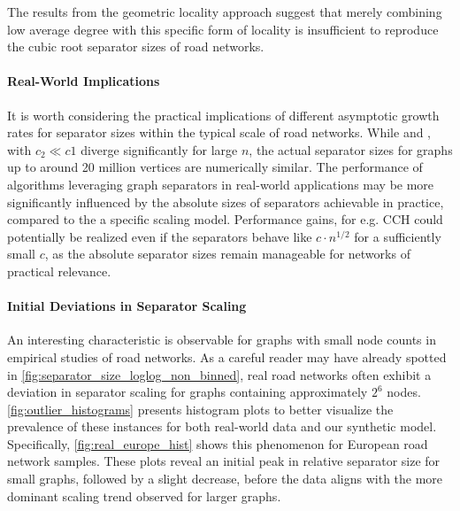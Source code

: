 The results from the geometric locality approach suggest that merely combining low average degree with this specific form of locality is insufficient to reproduce the cubic root separator sizes of road networks.

\paragraph{Real-World Implications}

It is worth considering the practical implications of different asymptotic growth rates for separator sizes within the typical scale of road networks.
While  and , with \(c_2 \ll c1\) diverge significantly for large \(n\), the actual separator sizes for graphs up to around 20 million vertices are numerically similar.
The performance of algorithms leveraging graph separators in real-world applications may be more significantly influenced by the absolute sizes of separators achievable in practice, compared to the a specific scaling model.
Performance gains, for e.g. CCH could potentially be realized even if the separators behave like \(c \cdot n^{1/2}\) for a sufficiently small \(c\), as the absolute separator sizes remain manageable for networks of practical relevance.

\paragraph{Initial Deviations in Separator Scaling}

An interesting characteristic is observable for graphs with small node counts in empirical studies of road networks.
As a careful reader may have already spotted in \cref{fig:separator_size_loglog_non_binned}, real road networks often exhibit a deviation in separator scaling for graphs containing approximately \(2^6\) nodes.
\cref{fig:outlier_histograms} presents histogram plots to better visualize the prevalence of these instances for both real-world data and our synthetic model.
Specifically, \cref{fig:real_europe_hist} shows this phenomenon for European road network samples.
These plots reveal an initial peak in relative separator size for small graphs, followed by a slight decrease, before the data aligns with the more dominant scaling trend observed for larger graphs.

